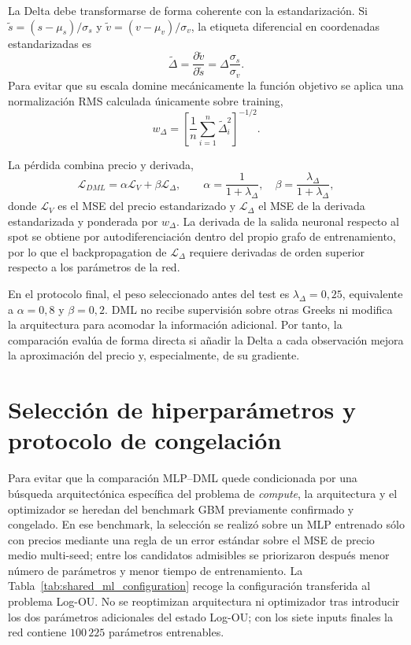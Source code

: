 La Delta debe transformarse de forma coherente con la estandarización. Si
$\widetilde s=(s-\mu_s)/\sigma_s$ y
$\widetilde v=(v-\mu_v)/\sigma_v$, la etiqueta diferencial en coordenadas
estandarizadas es
\begin{equation}
    \widetilde\Delta
    =\frac{\partial\widetilde v}{\partial\widetilde s}
    =\Delta\frac{\sigma_s}{\sigma_v}.
    \label{eq:dml_scaled_delta}
\end{equation}
Para evitar que su escala domine mecánicamente la función objetivo se aplica una
normalización RMS calculada únicamente sobre training,
\begin{equation}
    w_\Delta=\left[\frac{1}{n}\sum_{i=1}^{n}
    \widetilde\Delta_i^2\right]^{-1/2}.
    \label{eq:dml_derivative_weight}
\end{equation}

La pérdida combina precio y derivada,
\begin{equation}
    \mathcal L_{DML}=\alpha\mathcal L_V+\beta\mathcal L_\Delta,
    \qquad
    \alpha=\frac{1}{1+\lambda_\Delta},\quad
    \beta=\frac{\lambda_\Delta}{1+\lambda_\Delta},
    \label{eq:dml_total_loss}
\end{equation}
donde $\mathcal L_V$ es el MSE del precio estandarizado y
$\mathcal L_\Delta$ el MSE de la derivada estandarizada y ponderada por
$w_\Delta$. La derivada de la salida neuronal respecto al spot se obtiene por
autodiferenciación dentro del propio grafo de entrenamiento, por lo que el
backpropagation de $\mathcal L_\Delta$ requiere derivadas de orden superior
respecto a los parámetros de la red.

En el protocolo final, el peso seleccionado antes del test es $\lambda_\Delta=0{,}25$, equivalente a $\alpha=0{,}8$ y $\beta=0{,}2$.
DML no recibe supervisión sobre otras Greeks ni modifica la arquitectura para
acomodar la información adicional. Por tanto, la comparación evalúa de forma
directa si añadir la Delta a cada observación mejora la aproximación del precio
y, especialmente, de su gradiente.


\section{Selección de hiperparámetros y protocolo de congelación}
\label{sec:model_selection}

Para evitar que la comparación MLP--DML quede condicionada por una búsqueda
arquitectónica específica del problema de \textit{compute}, la arquitectura y el
optimizador se heredan del benchmark GBM previamente confirmado y congelado. En
ese benchmark, la selección se realizó sobre un MLP entrenado sólo con precios
mediante una regla de un error estándar sobre el MSE de precio medio
multi-seed; entre los candidatos admisibles se priorizaron después menor número
de parámetros y menor tiempo de entrenamiento. La Tabla~\ref{tab:shared_ml_configuration} recoge la configuración transferida al
problema Log-OU. No se reoptimizan arquitectura ni optimizador tras
introducir los dos parámetros adicionales del estado Log-OU; con los siete inputs
finales la red contiene $100\,225$ parámetros entrenables.

